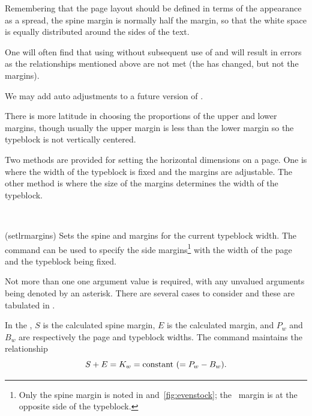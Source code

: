     Remembering that the page layout should be defined in terms of the
appearance as a spread, the spine margin 
is normally half the \foredge{} margin, 
so that the white space is equally distributed around the sides of the text. 

\begin{note}
  One will often find that using \cmd{\settypeblocksize} without
  subsequent use of \cmd{\setlrmargins} and \cmd{\setulmargins} will
  result in errors as the relationships mentioned above are not met
  (the \lnc{\textwidth} has changed, but not the margins).

  We may add auto adjustments to a future version of \theclass.
\end{note}


    There is more latitude in choosing the 
proportions 
of the upper and lower margins, though usually the upper 
margin is less than the lower margin
so the typeblock is not vertically centered.

    Two methods are provided for setting the horizontal dimensions on a page.
One is where the width of the typeblock 
is fixed and the margins are adjustable. 
The other method is where the size of the margins determines 
the width of the typeblock.

\begin{syntax}
\cmd{\setlrmargins} \\
\end{syntax}
\glossary(setlrmargins)%
  {}%
  {Sets the spine and \foredge{} margins for the current typeblock width.}
The command \cmd{\setlrmargins} can be used to specify
the side margins\footnote{Only the spine margin is noted in
 and~\ref{fig:evenstock}; 
the \foredge\ margin is at the 
opposite side of the typeblock.} 
with the width of the page and the typeblock being fixed.
 
Not more than one one argument value is required, with any
unvalued arguments being denoted by an asterisk. There are several cases to 
consider and these are tabulated in .

    In the \tablerefname, $S$ is the calculated spine 
margin, 
$E$ is the calculated \foredge{} margin, 
and $P_{w}$ and $B_{w}$ are respectively the page and 
typeblock 
widths. The \cmd{\setlrmargins} command maintains the relationship
\begin{displaymath}
S + E = K_{w}  = \textrm{constant} \mbox{\space} (= P_{w} - B_{w}).
\end{displaymath}


